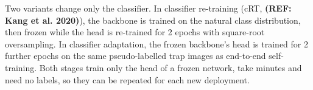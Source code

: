 Two variants change only the classifier.
In classifier re-training (cRT, \textbf{(REF: Kang et al. 2020)}), the backbone is trained on the natural class distribution, then frozen while the head is re-trained for 2 epochs with square-root oversampling.
In classifier adaptation, the frozen backbone's head is trained for 2 further epochs on the same pseudo-labelled trap images as end-to-end self-training.
Both stages train only the head of a frozen network, take minutes and need no labels, so they can be repeated for each new deployment.
